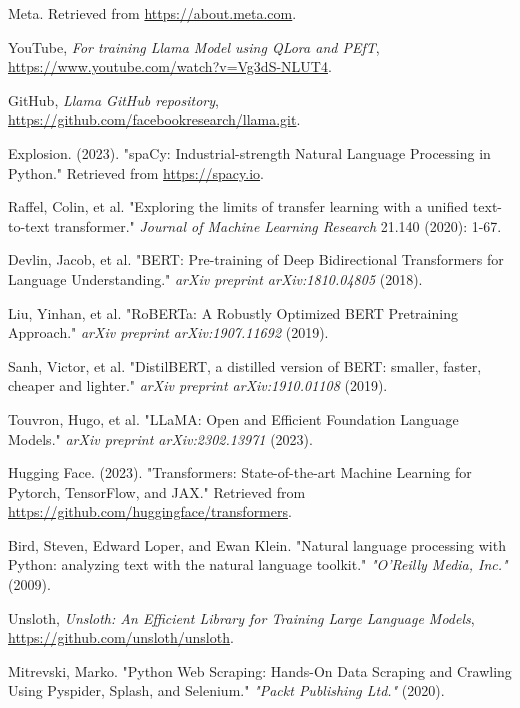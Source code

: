 \documentclass[final,1p,times]{elsarticle}
\begin{document}
\begin{thebibliography}{99}
        Meta. Retrieved from \url{https://about.meta.com}.

        YouTube, \emph{For training Llama Model using QLora and PEfT}, \href{https://www.youtube.com/watch?v=Vg3dS-NLUT4}{https://www.youtube.com/watch?v=Vg3dS-NLUT4}.

        GitHub, \emph{Llama GitHub repository}, \href{https://github.com/facebookresearch/llama.git}{https://github.com/facebookresearch/llama.git}.

        Explosion. (2023). "spaCy: Industrial-strength Natural Language Processing in Python." Retrieved from \url{https://spacy.io}.

        Raffel, Colin, et al. "Exploring the limits of transfer learning with a unified text-to-text transformer." \emph{Journal of Machine Learning Research} 21.140 (2020): 1-67.

        Devlin, Jacob, et al. "BERT: Pre-training of Deep Bidirectional Transformers for Language Understanding." \emph{arXiv preprint arXiv:1810.04805} (2018).

        Liu, Yinhan, et al. "RoBERTa: A Robustly Optimized BERT Pretraining Approach." \emph{arXiv preprint arXiv:1907.11692} (2019).

        Sanh, Victor, et al. "DistilBERT, a distilled version of BERT: smaller, faster, cheaper and lighter." \emph{arXiv preprint arXiv:1910.01108} (2019).

        Touvron, Hugo, et al. "LLaMA: Open and Efficient Foundation Language Models." \emph{arXiv preprint arXiv:2302.13971} (2023).

        Hugging Face. (2023). "Transformers: State-of-the-art Machine Learning for Pytorch, TensorFlow, and JAX." Retrieved from \url{https://github.com/huggingface/transformers}.

        Bird, Steven, Edward Loper, and Ewan Klein. "Natural language processing with Python: analyzing text with the natural language toolkit." \emph{"O'Reilly Media, Inc."} (2009).

        Unsloth, \emph{Unsloth: An Efficient Library for Training Large Language Models}, \href{https://github.com/unsloth/unsloth}{https://github.com/unsloth/unsloth}.

        Mitrevski, Marko. "Python Web Scraping: Hands-On Data Scraping and Crawling Using Pyspider, Splash, and Selenium." \emph{"Packt Publishing Ltd."} (2020).


\end{thebibliography}
\end{document}
